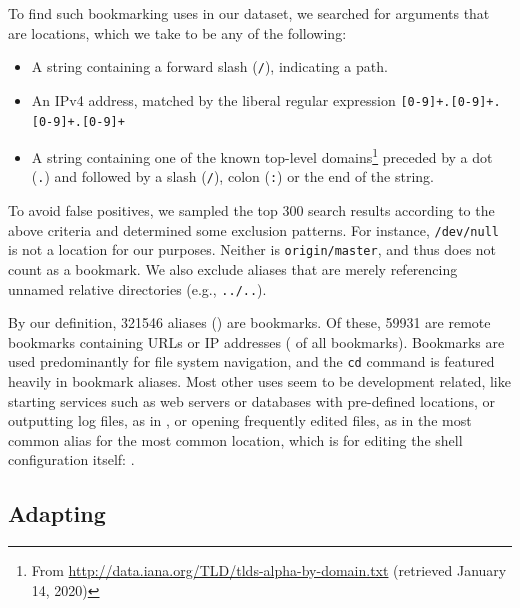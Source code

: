 To find such bookmarking uses in our dataset, we searched for arguments that are locations, which we take to be any of the following:
\begin{itemize}
    \item A string containing a forward slash (\verb|/|), indicating a path.
    \item An IPv4 address, matched by the liberal regular expression \verb|[0-9]+.[0-9]+.[0-9]+.[0-9]+|
    \item A string containing one of the known top-level domains\footnote{From \url{http://data.iana.org/TLD/tlds-alpha-by-domain.txt} (retrieved January 14, 2020)} preceded by a dot (\verb|.|) and followed by a slash (\verb|/|), colon (\verb|:|) or the end of the string.
\end{itemize}
To avoid false positives, we sampled the top 300 search results according to the above criteria and determined some exclusion patterns.
For instance, \texttt{/dev/null} is not a location for our purposes.
Neither is \texttt{origin/master}, and thus  does not count as a bookmark.
We also exclude aliases that are merely referencing unnamed relative directories (e.g., \verb|../..|).

By our definition, \num{321546} aliases () are bookmarks.
Of these, \num{59931} are remote bookmarks containing URLs or IP addresses ( of all bookmarks).
Bookmarks are used predominantly for file system navigation, and the \verb|cd| command is featured heavily in bookmark aliases.
Most other uses seem to be development related, like starting services such as web servers or databases with pre-defined locations,
or outputting log files, as in , or opening frequently edited files, as in the most common alias for the most common location, which is for editing the shell configuration itself: .

%     

\subsection{Adapting}


